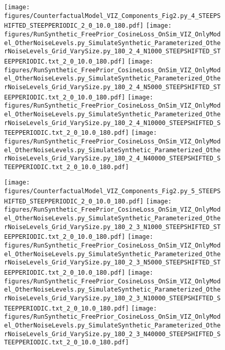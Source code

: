 \documentclass{article}
\begin{document}
\begin{figure}
\texttt{[image: figures/CounterfactualModel\_VIZ\_Components\_Fig2.py\_4\_STEEPSHIFTED\_STEEPPERIODIC\_2\_0\_10.0\_180.pdf]}
\texttt{[image: figures/RunSynthetic\_FreePrior\_CosineLoss\_OnSim\_VIZ\_OnlyModel\_OtherNoiseLevels.py\_SimulateSynthetic\_Parameterized\_OtherNoiseLevels\_Grid\_VarySize.py\_180\_2\_4\_N1000\_STEEPSHIFTED\_STEEPPERIODIC.txt\_2\_0\_10.0\_180.pdf]}
\texttt{[image: figures/RunSynthetic\_FreePrior\_CosineLoss\_OnSim\_VIZ\_OnlyModel\_OtherNoiseLevels.py\_SimulateSynthetic\_Parameterized\_OtherNoiseLevels\_Grid\_VarySize.py\_180\_2\_4\_N5000\_STEEPSHIFTED\_STEEPPERIODIC.txt\_2\_0\_10.0\_180.pdf]}
\texttt{[image: figures/RunSynthetic\_FreePrior\_CosineLoss\_OnSim\_VIZ\_OnlyModel\_OtherNoiseLevels.py\_SimulateSynthetic\_Parameterized\_OtherNoiseLevels\_Grid\_VarySize.py\_180\_2\_4\_N10000\_STEEPSHIFTED\_STEEPPERIODIC.txt\_2\_0\_10.0\_180.pdf]}
\texttt{[image: figures/RunSynthetic\_FreePrior\_CosineLoss\_OnSim\_VIZ\_OnlyModel\_OtherNoiseLevels.py\_SimulateSynthetic\_Parameterized\_OtherNoiseLevels\_Grid\_VarySize.py\_180\_2\_4\_N40000\_STEEPSHIFTED\_STEEPPERIODIC.txt\_2\_0\_10.0\_180.pdf]}


\texttt{[image: figures/CounterfactualModel\_VIZ\_Components\_Fig2.py\_5\_STEEPSHIFTED\_STEEPPERIODIC\_2\_0\_10.0\_180.pdf]}
\texttt{[image: figures/RunSynthetic\_FreePrior\_CosineLoss\_OnSim\_VIZ\_OnlyModel\_OtherNoiseLevels.py\_SimulateSynthetic\_Parameterized\_OtherNoiseLevels\_Grid\_VarySize.py\_180\_2\_3\_N1000\_STEEPSHIFTED\_STEEPPERIODIC.txt\_2\_0\_10.0\_180.pdf]}
\texttt{[image: figures/RunSynthetic\_FreePrior\_CosineLoss\_OnSim\_VIZ\_OnlyModel\_OtherNoiseLevels.py\_SimulateSynthetic\_Parameterized\_OtherNoiseLevels\_Grid\_VarySize.py\_180\_2\_3\_N5000\_STEEPSHIFTED\_STEEPPERIODIC.txt\_2\_0\_10.0\_180.pdf]}
\texttt{[image: figures/RunSynthetic\_FreePrior\_CosineLoss\_OnSim\_VIZ\_OnlyModel\_OtherNoiseLevels.py\_SimulateSynthetic\_Parameterized\_OtherNoiseLevels\_Grid\_VarySize.py\_180\_2\_3\_N10000\_STEEPSHIFTED\_STEEPPERIODIC.txt\_2\_0\_10.0\_180.pdf]}
\texttt{[image: figures/RunSynthetic\_FreePrior\_CosineLoss\_OnSim\_VIZ\_OnlyModel\_OtherNoiseLevels.py\_SimulateSynthetic\_Parameterized\_OtherNoiseLevels\_Grid\_VarySize.py\_180\_2\_3\_N40000\_STEEPSHIFTED\_STEEPPERIODIC.txt\_2\_0\_10.0\_180.pdf]}



\end{figure}
\end{document}
